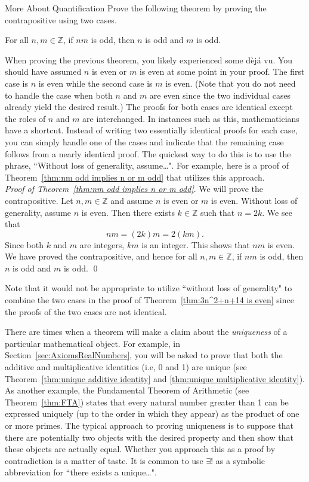 \begin{section}{More About Quantification}
Prove the following theorem by proving the contrapositive using two cases.

\begin{theorem}\label{thm:nm odd implies n or m odd} %
For all $n,m\in\mathbb{Z}$, if $nm$ is odd, then $n$ is odd and $m$ is odd.
\end{theorem}

When proving the previous theorem, you likely experienced some d\`ej\'a vu. You should have assumed $n$ is even or $m$ is even at some point in your proof. The first case is $n$ is even while the second case is $m$ is even.  (Note that you do not need to handle the case when both $n$ and $m$ are even since the two individual cases already yield the desired result.) The proofs for both cases are identical except the roles of $n$ and $m$ are interchanged.  In instances such as this, mathematicians have a shortcut. Instead of writing two essentially identical proofs for each case, you can simply handle one of the cases and indicate that the remaining case follows from a nearly identical proof.  The quickest way to do this is to use the phrase, ``Without loss of generality, assume\ldots".  For example, here is a proof of Theorem~\ref{thm:nm odd implies n or m odd} that utilizes this approach.\\

\noindent \emph{Proof of Theorem~\ref{thm:nm odd implies n or m odd}}. We will prove the contrapositive.  Let $n,m\in\mathbb{Z}$ and assume $n$ is even or $m$ is even. Without loss of generality, assume $n$ is even.  Then there exists $k\in\mathbb{Z}$ such that $n=2k$. We see that
\[
nm=(2k)m=2(km).
\]
Since both $k$ and $m$ are integers, $km$ is an integer. This shows that $nm$ is even. We have proved the contrapositive, and hence for all $n,m\in\mathbb{Z}$, if $nm$ is odd, then $n$ is odd and $m$ is odd. \qed

Note that it would not be appropriate to utilize ``without loss of generality" to combine the two cases in the proof of Theorem~\ref{thm:3n^2+n+14 is even} since the proofs of the two cases are not identical.

There are times when a theorem will make a claim about the \emph{uniqueness} of a particular mathematical object.  For example, in Section~\ref{sec:AxiomsRealNumbers}, you will be asked to prove that both the additive and multiplicative identities (i.e, 0 and 1) are unique (see Theorem~\ref{thm:unique additive identity} and \ref{thm:unique multiplicative identity}). As another example, the Fundamental Theorem of Arithmetic (see Theorem~\ref{thm:FTA}) states that every natural number greater than 1 can be expressed uniquely (up to the order in which they appear) as the product of one or more primes. The typical approach to proving uniqueness is to suppose that there are potentially two objects with the desired property and then show that these objects are actually equal. Whether you approach this as a proof by contradiction is a matter of taste. It is common to use $\boxed{\exists!}$ as a symbolic abbreviation for ``there exists a unique\ldots".


\end{section}
